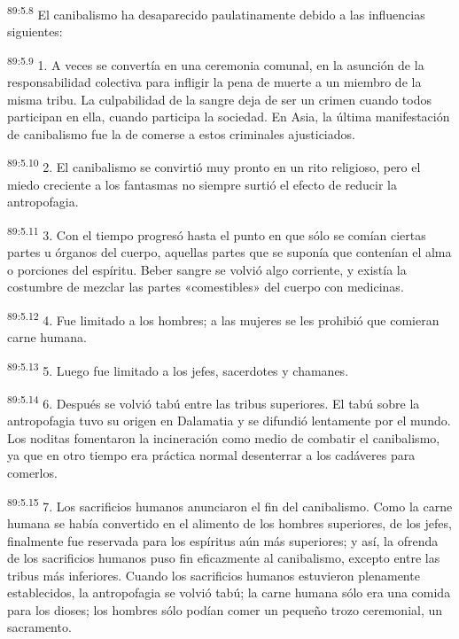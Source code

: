 \par
\textsuperscript{89:5.8} El canibalismo ha desaparecido paulatinamente debido a las influencias siguientes:

\par
\textsuperscript{89:5.9} 1. A veces se convertía en una ceremonia comunal, en la asunción de la responsabilidad colectiva para infligir la pena de muerte a un miembro de la misma tribu. La culpabilidad de la sangre deja de ser un crimen cuando todos participan en ella, cuando participa la sociedad. En Asia, la última manifestación de canibalismo fue la de comerse a estos criminales ajusticiados.

\par
\textsuperscript{89:5.10} 2. El canibalismo se convirtió muy pronto en un rito religioso, pero el miedo creciente a los fantasmas no siempre surtió el efecto de reducir la antropofagia.

\par
\textsuperscript{89:5.11} 3. Con el tiempo progresó hasta el punto en que sólo se comían ciertas partes u órganos del cuerpo, aquellas partes que se suponía que contenían el alma o porciones del espíritu. Beber sangre se volvió algo corriente, y existía la costumbre de mezclar las partes «comestibles» del cuerpo con medicinas.

\par
\textsuperscript{89:5.12} 4. Fue limitado a los hombres; a las mujeres se les prohibió que comieran carne humana.

\par
\textsuperscript{89:5.13} 5. Luego fue limitado a los jefes, sacerdotes y chamanes.

\par
\textsuperscript{89:5.14} 6. Después se volvió tabú entre las tribus superiores. El tabú sobre la antropofagia tuvo su origen en Dalamatia y se difundió lentamente por el mundo. Los noditas fomentaron la incineración como medio de combatir el canibalismo, ya que en otro tiempo era práctica normal desenterrar a los cadáveres para comerlos.

\par
\textsuperscript{89:5.15} 7. Los sacrificios humanos anunciaron el fin del canibalismo. Como la carne humana se había convertido en el alimento de los hombres superiores, de los jefes, finalmente fue reservada para los espíritus aún más superiores; y así, la ofrenda de los sacrificios humanos puso fin eficazmente al canibalismo, excepto entre las tribus más inferiores. Cuando los sacrificios humanos estuvieron plenamente establecidos, la antropofagia se volvió tabú; la carne humana sólo era una comida para los dioses; los hombres sólo podían comer un pequeño trozo ceremonial, un sacramento.

